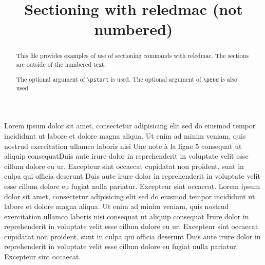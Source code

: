 \documentclass{article}
\begin{document}
\begin{english}
\date{}
\title{Sectioning with reledmac (not numbered)}
\maketitle
\begin{abstract}
This file provides examples of use of sectioning commands with reledmac.
The sections are outside of the numbered text. 

The optional argument of \verb+\pstart+ is used. The optional argument of \verb+\pend+ is also used.
\end{abstract}
\end{english}

\beginnumbering
{}
Lorem ipsum dolor sit amet, consectetur adipisicing elit
sed do eiusmod tempor incididunt ut labore et dolore
magna aliqua. Ut enim ad minim veniam, quis nostrud
exercitation ullamco laboris nisi
Une note à la ligne 5 consequat ut aliquip consequat\pend[\vskip 2ex]
Duis aute irure dolor in reprehenderit
in voluptate velit esse cillum dolore eu ur. Excepteur sint occaecat
cupidatat non proident, sunt in culpa qui officia deserunt
Duis aute irure dolor in reprehenderit
in voluptate velit esse cillum dolore eu fugiat nulla
pariatur. Excepteur sint occaecat.
\pend[]
Lorem ipsum dolor sit amet, consectetur adipisicing elit
sed do eiusmod tempor incididunt ut labore et dolore
magna aliqua. Ut enim ad minim veniam, quis nostrud
exercitation ullamco laboris nisi
 consequat ut aliquip consequat
Irure dolor in reprehenderit
in voluptate velit esse cillum dolore eu ur. Excepteur sint occaecat
cupidatat non proident, sunt in culpa qui officia deserunt
Duis aute irure dolor in reprehenderit
in voluptate velit esse cillum dolore eu fugiat nulla
pariatur. Excepteur sint occaecat.
\pend
\endnumbering
\end{document}
